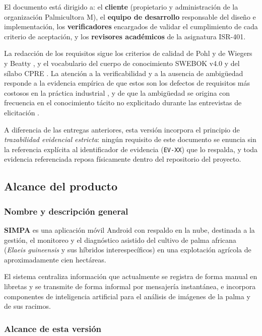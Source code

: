 \documentclass[11pt,a4paper]{article}
\newcommand{\id}[1]{\texttt{\begingroup\hyphenpenalty=10000\relax#1\endgroup}}
\renewcommand{\id}[1]{\texttt{#1}}
\begin{document}
El documento está dirigido a: el \textbf{cliente} (propietario y administración de la organización
Palmicultora M), el \textbf{equipo de desarrollo} responsable del diseño e implementación, los
\textbf{verificadores} encargados de validar el cumplimiento de cada criterio de aceptación, y los
\textbf{revisores académicos} de la asignatura ISR-401.

La redacción de los requisitos sigue los criterios de calidad de Pohl \cite{pohl2010} y de Wiegers y
Beatty \cite{wiegers2013}, y el vocabulario del cuerpo de conocimiento SWEBOK v4.0 \cite{swebok4} y
del sílabo CPRE \cite{ireb2023}. La atención a la verificabilidad y a la ausencia de ambigüedad
responde a la evidencia empírica de que estos son los defectos de requisitos más costosos en la
práctica industrial \cite{mendez2017,montgomery2022}, y de que la ambigüedad se origina con
frecuencia en el conocimiento tácito no explicitado durante las entrevistas de elicitación
\cite{ferrari2016}.

A diferencia de las entregas anteriores, esta versión incorpora el principio de \emph{trazabilidad
evidencial estricta}: ningún requisito de este documento se enuncia sin la referencia explícita al
identificador de evidencia (\id{EV-XX}) que lo respalda, y toda evidencia referenciada reposa
físicamente dentro del repositorio del proyecto.

\subsection{Alcance del producto}

\subsubsection{Nombre y descripción general}

\textbf{SIMPA} es una aplicación móvil Android con respaldo en la nube, destinada a la gestión,
el monitoreo y el diagnóstico asistido del cultivo de palma africana (\emph{Elaeis guineensis} y
sus híbridos interespecíficos) en una explotación agrícola de aproximadamente cien hectáreas.

El sistema centraliza información que actualmente se registra de forma manual en libretas y se
transmite de forma informal por mensajería instantánea, e incorpora componentes de inteligencia
artificial para el análisis de imágenes de la palma y de sus racimos.

\subsubsection{Alcance de esta versión}
\end{document}
